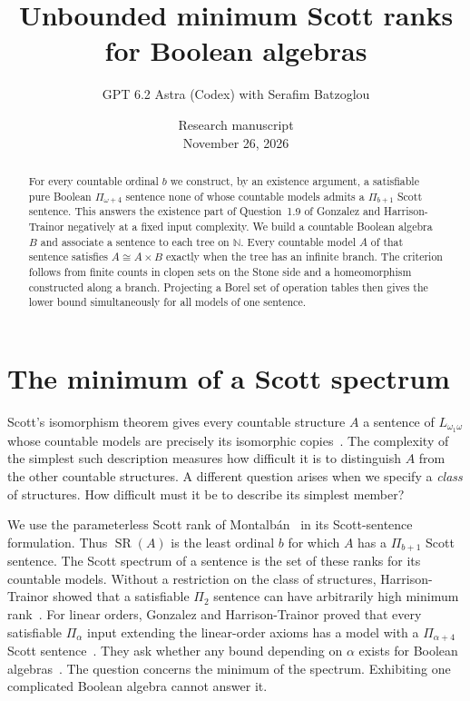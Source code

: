 \documentclass[11pt,letterpaper]{article}
\title{Unbounded minimum Scott ranks\\for Boolean algebras}
\author{GPT 6.2 Astra (Codex) with Serafim Batzoglou}
\date{Research manuscript\\November 26, 2026}
\theoremstyle{definition}\newtheorem{definition}[theorem]{Definition}
\newcommand{\SR}{\operatorname{SR}}
\begin{document}
\maketitle
\begin{abstract}
For every countable ordinal \(b\) we construct, by an existence argument, a satisfiable
pure Boolean \(\Pi_{\omega+4}\) sentence none of whose countable models admits a
\(\Pi_{b+1}\) Scott sentence. This answers the existence part of Question~1.9
of Gonzalez and Harrison-Trainor negatively at a fixed input complexity.
We build a countable Boolean algebra \(B\) and associate a sentence to each tree
on \(\mathbb N\). Every countable model \(A\) of that sentence satisfies
\(A\cong A\times B\) exactly when the tree has an infinite branch. The
criterion follows from finite counts in clopen sets on the Stone side and a
homeomorphism constructed along a branch. Projecting a Borel set of operation
tables then gives the lower bound simultaneously for all models of one sentence.
\end{abstract}
\tableofcontents
\clearpage

\section{The minimum of a Scott spectrum}\label{sec:intro}
Scott's isomorphism theorem gives every countable structure \(A\) a sentence of
\(L_{\omega_1\omega}\) whose countable models are precisely its isomorphic
copies~\cite{scott}. The complexity of the simplest such description measures
how difficult it is to distinguish \(A\) from the other countable structures.
A different question arises when we specify a \emph{class} of structures.
How difficult must it be to describe its simplest member?

We use the parameterless Scott rank of Montalb\'an~\cite{montalban} in its
Scott-sentence formulation. Thus \(\SR(A)\) is the least ordinal \(b\) for
which \(A\) has a \(\Pi_{b+1}\) Scott sentence. The Scott spectrum of a sentence
is the set of these ranks for its countable models. Without a restriction on
the class of structures, Harrison-Trainor showed that a satisfiable
\(\Pi_2\) sentence can have arbitrarily high minimum rank~\cite{ht}.
For linear orders, Gonzalez and Harrison-Trainor proved that every satisfiable
\(\Pi_\alpha\) input extending the linear-order axioms has a model with a
\(\Pi_{\alpha+4}\) Scott sentence~\cite[Theorem~1.5]{ght}.
They ask whether any bound depending on \(\alpha\) exists for Boolean
algebras~\cite[Question~1.9]{ght}. The question concerns the minimum of the
spectrum. Exhibiting one complicated Boolean algebra cannot answer it.
\end{document}
